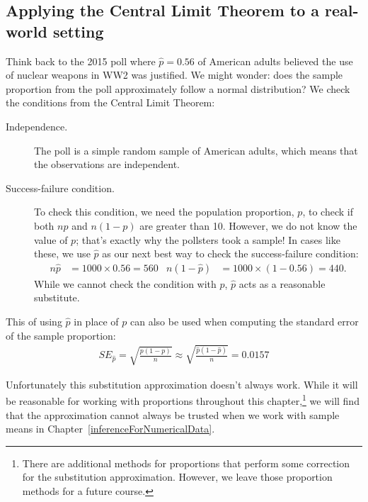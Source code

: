 

\subsection{Applying the Central Limit Theorem to a real-world setting}

Think back to the 2015 poll where
$\hat{p} = 0.56$ of American adults believed the use of nuclear
weapons in WW2 was justified. We might wonder: does the sample
proportion from the poll approximately follow a normal
distribution? We check the conditions from the Central
Limit Theorem:
\begin{description}
\item[Independence.] The poll is a simple random sample of
    American adults, which means that the observations are
    independent.
\item[Success-failure condition.] To check this condition,
    we need the population proportion, $p$, to check if both
    $np$ and $n(1-p)$ are greater than 10. However, we do not
    know the value of $p$; that's exactly why the pollsters
    took a sample! In cases like these, we use $\hat{p}$ as
    our next best way to check the success-failure condition:
    \begin{align*}
    n\hat{p} &= 1000 \times 0.56 = 560
    &n (1 - \hat{p}) &= 1000 \times (1 - 0.56) = 440.
    \end{align*}
    While we cannot check the condition with $p$,
    $\hat{p}$ acts as a reasonable substitute.
\end{description}

This  of using $\hat{p}$ in
place of $p$ can also be used when computing the standard error
of the sample proportion:
\begin{align*}
SE_{\hat{p}}
    = \sqrt{\frac{p (1 - p)}{n}}
    \approx \sqrt{\frac{\hat{p} (1 - \hat{p})}{n}}
    = 0.0157
\end{align*}

Unfortunately this substitution approximation doesn't always work.
While it will be reasonable for working with proportions
throughout this chapter,\footnote{There are additional methods
for proportions that perform some correction for the substitution
approximation. However, we leave those proportion methods for
a future course.}
we will find that the approximation cannot always be trusted
when we work with sample means in
Chapter~\ref{inferenceForNumericalData}.




